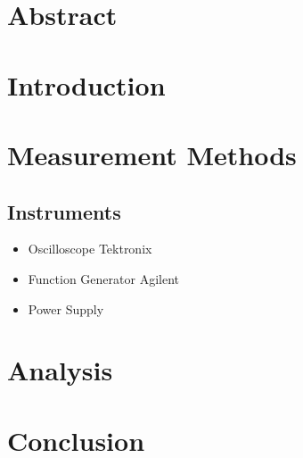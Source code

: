 \documentclass[a4paper]{article}
\begin{document}
\title{}
\author{Stefano Pilosio}

\maketitle

\section{Abstract}
\section{Introduction}

\section{Measurement Methods}
\subsection{Instruments}
\begin{itemize}
    \item Oscilloscope Tektronix
    \item Function Generator Agilent
    \item Power Supply
\end{itemize}

\section{Analysis}
\section{Conclusion}
\end{document}
